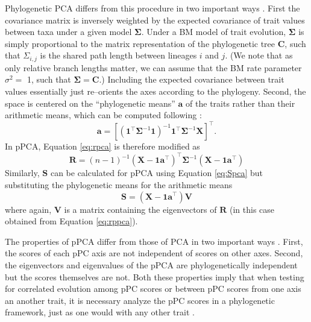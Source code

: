 \documentclass[a4paper,11pt]{article}
\begin{document}
Phylogenetic PCA differs from this procedure in two important ways \citep{Revell2008,Polly2013} . First the covariance matrix is inversely weighted by the expected covariance of trait values between taxa under a given model $\mathbf{\Sigma}$. Under a BM model of trait evolution, $\mathbf{\Sigma}$ is simply proportional to the matrix representation of the phylogenetic tree $\mathbf{C}$, such that $\Sigma_{i,j}$ is the shared path length between lineages $i$ and $j$. (We note that as only relative branch lengths matter, we can assume that the BM rate parameter $\sigma^2=$ 1, such that $\mathbf{\Sigma}=\mathbf{C}$.) Including the expected covariance between trait values essentially just re--orients the axes according to the phylogeny. Second, the space is centered on the ``phylogenetic means'' $\mathbf{a}$ of the traits rather than their arithmetic means, which can be computed following \citet{RevellHarmon2008}:
\begin{equation}\label{eq:phymean}
\mathbf{a}=[(\mathbf{1}^\intercal \mathbf{\Sigma}^{-1} \mathbf{1})^{-1} 
\mathbf{1}^\intercal \mathbf{\Sigma}^{-1} \mathbf{X}]^\intercal.
\end{equation}
In pPCA, Equation \ref{eq:rpca} is therefore modified as
\begin{equation}\label{eq:rppca}
\mathbf{R} = (n-1)^{-1}(\mathbf{X} - \mathbf{1a}^\intercal)^\intercal \mathbf{\Sigma}^{-1} (\mathbf{X} - \mathbf{1a}^\intercal)
\end{equation}
Similarly, $\mathbf{S}$ can be calculated for pPCA using Equation \ref{eq:Spca} but substituting the phylogenetic means for the arithmetic means
\begin{equation}\label{eq:Sppca}
\mathbf{S}=(\mathbf{X} - \mathbf{1a}^\intercal)\mathbf{V}
\end{equation}
where again, $\mathbf{V}$ is a matrix containing the eigenvectors of $\mathbf{R}$ (in this case obtained from Equation \ref{eq:rppca}).

The properties of pPCA differ from those of PCA in two important ways \citep{Revell2008, Polly2013}. First, the scores of each pPC axis are not independent of scores on other axes. Second, the eigenvectors and eigenvalues of the pPCA are phylogenetically independent but the scores themselves are not. Both these properties imply that when testing for correlated evolution among pPC scores or between pPC scores from one axis an another trait, it is necessary analyze the pPC scores in a phylogenetic framework, just as one would with any other trait \citep{Revell2008, Polly2013}. 
\end{document}
